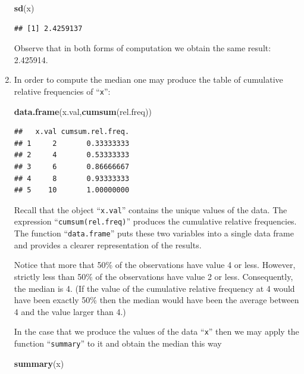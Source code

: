 \documentclass[]{krantz}
\makeatletter
\newenvironment{Shaded}{\begin{snugshade}}{\end{snugshade}}
\newcommand{\KeywordTok}[1]{\textcolor[rgb]{0.13,0.29,0.53}{\textbf{#1}}}
\newcommand{\NormalTok}[1]{#1}
\newenvironment{kframe}{%
\medskip{}
\setlength{\fboxsep}{.8em}
 \def\at@end@of@kframe{}%
 \ifinner\ifhmode%
  \def\at@end@of@kframe{\end{minipage}}%
  \begin{minipage}{\columnwidth}%
 \fi\fi%
 \def\FrameCommand##1{\hskip\@totalleftmargin \hskip-\fboxsep
 \colorbox{shadecolor}{##1}\hskip-\fboxsep
     \hskip-\linewidth \hskip-\@totalleftmargin \hskip\columnwidth}%
 \MakeFramed {\advance\hsize-\width
   \@totalleftmargin\z@ \linewidth\hsize
   \@setminipage}}%
 {\par\unskip\endMakeFramed%
 \at@end@of@kframe}
\renewenvironment{Shaded}{\begin{kframe}}{\end{kframe}}
\theoremstyle{definition}
\theoremstyle{definition}
\theoremstyle{definition}
\theoremstyle{remark}
\makeatother
\begin{document}
\begin{enumerate}
\begin{Shaded}
\begin{Highlighting}[]
\KeywordTok{sd}\NormalTok{(x)}
\end{Highlighting}
\end{Shaded}

\begin{verbatim}
## [1] 2.4259137
\end{verbatim}

  Observe that in both forms of computation we obtain the same result:
  2.425914.
\item
  In order to compute the
  median one may produce the table of cumulative relative frequencies of
  ``\texttt{x}'':

\begin{Shaded}
\begin{Highlighting}[]
\KeywordTok{data.frame}\NormalTok{(x.val,}\KeywordTok{cumsum}\NormalTok{(rel.freq))}
\end{Highlighting}
\end{Shaded}

\begin{verbatim}
##   x.val cumsum.rel.freq.
## 1     2       0.33333333
## 2     4       0.53333333
## 3     6       0.86666667
## 4     8       0.93333333
## 5    10       1.00000000
\end{verbatim}

  Recall that the object ``\texttt{x.val}'' contains the unique values of the data.
  The expression ``\texttt{cumsum(rel.freq)}'' produces the cumulative relative
  frequencies. The function ``\texttt{data.frame}'' puts these two variables into a
  single data frame and provides a clearer representation of the results.

  Notice that more that 50\% of the observations have value 4 or less.
  However, strictly less than 50\% of the observations have value 2 or
  less. Consequently, the median is 4. (If the value of the cumulative
  relative frequency at 4 would have been exactly 50\% then the median
  would have been the average between 4 and the value larger than 4.)

  In the case that we produce the values of the data ``\texttt{x}'' then we may
  apply the function ``\texttt{summary}'' to it and obtain the median this way

\begin{Shaded}
\begin{Highlighting}[]
\KeywordTok{summary}\NormalTok{(x)}
\end{Highlighting}
\end{Shaded}


\end{enumerate}
\end{document}
